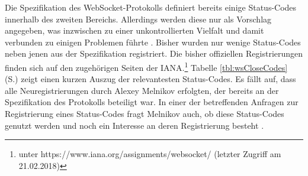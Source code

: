 \documentclass[11pt,a4paper,titlepage]{scrartcl}
\numberwithin{equation}{section}
\begin{document}
\noindent Die Spezifikation des WebSocket-Protokolls definiert bereits einige Status-Codes innerhalb des zweiten Bereichs. Allerdings werden diese nur als Vorschlag angegeben, was inzwischen zu einer unkontrollierten Vielfalt und damit verbunden zu einigen Problemen führte \autocite[53]{gorski_websockets_2015}. Bisher wurden nur wenige Status-Codes neben jenen aus der Spezifikation registriert. Die bisher offiziellen Registrierungen finden sich auf den zugehörigen Seiten der IANA.\footnote{unter https://www.iana.org/assignments/websocket/ (letzter Zugriff am 21.02.2018)} Tabelle \ref{tbl:wsCloseCodes} (S.\pageref{tbl:wsCloseCodes}) zeigt einen kurzen Auszug der relevantesten Status-Codes. Es fällt auf, dass alle Neuregistrierungen durch Alexey Melnikov erfolgten, der bereits an der Spezifikation des Protokolls beteiligt war. In einer der betreffenden Anfragen zur Registrierung eines Status-Codes fragt Melnikov auch, ob diese Status-Codes genutzt werden und noch ein Interesse an deren Registrierung besteht \autocite{melnikov_additional_2012}.
\end{document}
